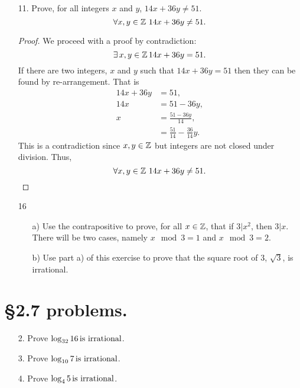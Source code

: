 \documentclass[a4paper, 12pt]{../../config/homework}
\begin{document}
\begin{enumerate}
\vspace{2\singlelineheight}
\item[11.] Prove, for all integers $x$ and $y$, $14x+36y\neq 51.$
\[\forall x,y\in\ints\ 14x+36y\neq51.\]
\begin{proof}
We proceed with a proof by contradiction:
\[\exists\,x,y\in\mathbb{Z}\,14x+36y=51.\]
If there are two integers, $x$ and $y$ such that $14x+36y=51$ then they can be found by re-arrangement. That is
\begin{align*}
14x + 36y &= 51,\\
14x &= 51 - 36y,\\
x &= \frac{51-36y}{14},\\
&= \frac{51}{14} - \frac{36}{14}y.
\end{align*}
This is a contradiction since $x,y\in\mathbb{Z}$ but integers are not closed under division. Thus,
\[\forall x,y\in\ints\ 14x+36y\neq51.\]
\end{proof}

\pagebreak
\item[16]
\begin{enumerate}
\item[a)] Use the contrapositive to prove, for all $x\in\mathbb{Z}$, that if $3|x^2$, then $3|x$. There will be two cases, namely $x\mod3=1$ and $x\mod3=2$.
\item[b)] Use part a) of this exercise to prove that the square root of $3$, $\sqrt{3}$, is irrational.
\end{enumerate}
\end{enumerate}

\pagebreak
\section*{\S 2.7 problems.}
\begin{enumerate}
\item[2.] Prove $\log_{32}16\,\text{is irrational}$.

\pagebreak
\item[3.] Prove $\log_{10}7\,\text{is irrational}$.

\pagebreak
\item[4.] Prove $\log_4{5}\,\text{is irrational}$.
\end{enumerate}

\pagebreak
\end{document}
